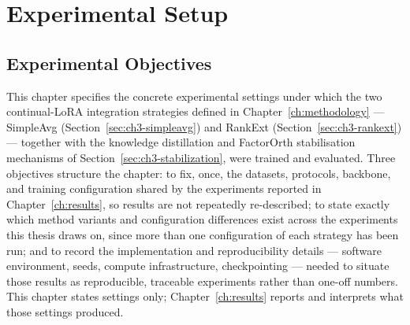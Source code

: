 %
%
%

\chapter{Experimental Setup}
\label{ch:experimental-setup}

\section{Experimental Objectives}
\label{sec:ch4-objectives}

This chapter specifies the concrete experimental settings under which the
two continual-LoRA integration strategies defined in
Chapter~\ref{ch:methodology} --- SimpleAvg (Section~\ref{sec:ch3-simpleavg})
and RankExt (Section~\ref{sec:ch3-rankext}) --- together with the knowledge
distillation and FactorOrth stabilisation mechanisms of
Section~\ref{sec:ch3-stabilization}, were trained and evaluated. Three
objectives structure the chapter: to fix, once, the datasets, protocols,
backbone, and training configuration shared by the experiments reported in
Chapter~\ref{ch:results}, so results are not repeatedly re-described; to
state exactly which method variants and configuration differences exist
across the experiments this thesis draws on, since more than one
configuration of each strategy has been run; and to record the
implementation and reproducibility details --- software environment, seeds,
compute infrastructure, checkpointing --- needed to situate those results as
reproducible, traceable experiments rather than one-off numbers. This
chapter states settings only; Chapter~\ref{ch:results} reports and
interprets what those settings produced.

